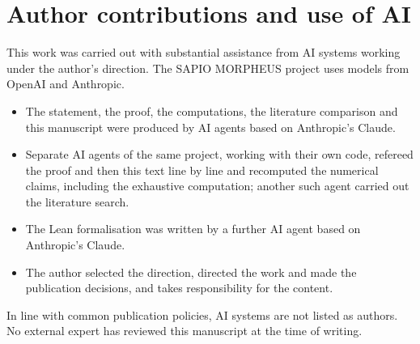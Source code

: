 \documentclass[11pt]{amsart}
\theoremstyle{plain}
\theoremstyle{remark}
\begin{document}
\section*{Author contributions and use of AI}
This work was carried out with substantial assistance from AI systems working under the author's direction. The
SAPIO MORPHEUS project uses models from OpenAI and Anthropic.
\begin{itemize}
\item The statement, the proof, the computations, the literature comparison and this manuscript were produced by AI
  agents based on Anthropic's Claude.
\item Separate AI agents of the same project, working with their own code, refereed the proof and then this text
  line by line and recomputed the numerical claims, including the exhaustive computation; another such agent
  carried out the literature search.
  
\item The Lean formalisation was written by a further AI agent based on Anthropic's Claude.
\item The author selected the direction, directed the work and made the publication decisions, and takes
  responsibility for the content.
\end{itemize}
In line with common publication policies, AI systems are not listed as authors. No external expert has reviewed
this manuscript at the time of writing.
\end{document}
